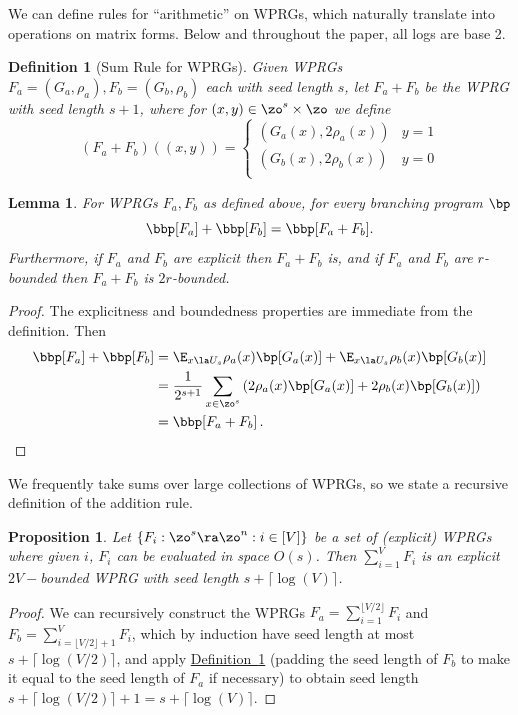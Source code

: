 \documentclass[11pt]{article}
\newcommand{\expref}[2]{\texorpdfstring{\hyperref[#2]{#1~\ref{#2}}}{#1~\ref{#2}}}
\newtheorem{lemma}[theorem]{Lemma}
\newtheorem{proposition}[theorem]{Proposition}
\newtheorem{definition}[theorem]{Definition}
\begin{document}
We can define rules for ``arithmetic'' on WPRGs, which naturally translate into operations on matrix forms. Below and throughout the paper, all logs are base 2.

\begin{definition}[Sum Rule for WPRGs]\label{def:addRule}
Given WPRGs $F_a=(G_a,\rho_a),F_b=(G_b,\rho_b)$ each with seed length $s$, let $F_a+F_b$ be the WPRG with seed length $s+1$, where for $(x,y)\in \zo^s\times\zo$ we define
\[
(F_a+F_b)((x,y)) = \begin{cases}
(G_a(x),2\rho_a(x)) & y=1\\
(G_b(x),2\rho_b(x)) & y=0\\
\end{cases}\]
\end{definition}
\begin{lemma}
For WPRGs $F_a,F_b$ as defined above, for every branching program $\bp$
$$\bbp[F_a]+\bbp[F_b]=\bbp[F_a+F_b].$$
Furthermore, if $F_a$ and $F_b$ are explicit then $F_a+F_b$ is, and if $F_a$ and $F_b$ are $r$-bounded then $F_a+F_b$ is $2r$-bounded.
\end{lemma}
\begin{proof}
The explicitness and boundedness properties are immediate from the definition.
Then %
\begin{align*}
    \bbp[F_a]+\bbp[F_b] &= \E_{x\la U_s}\rho_a(x)\bp[G_a(x)]+\E_{x\la U_s}\rho_b(x)\bp[G_b(x)]\\
    &= \frac{1}{2^{s+1}}\sum_{x\in \zo^s}\left(2\rho_a(x)\bp[G_a(x)]+2\rho_b(x)\bp[G_b(x)]\right)\\
    &= \bbp[F_a+F_b]\,.  \qedhere
\end{align*}
\end{proof}
We frequently take sums over large collections of WPRGs, so we state a recursive definition of the addition rule.
\begin{proposition}\label{prop:multiAdd}
Let $\{F_i:\zo^s\ra\zo^n:i\in [V]\}$ be a set of (explicit) WPRGs where given $i$, $F_i$ can be evaluated in space $O(s)$. Then
$\sum_{i=1}^VF_i$
is an explicit $2V-$bounded WPRG with seed length $s+\lceil\log(V)\rceil$.
\end{proposition}
\begin{proof}
We can recursively construct the WPRGs $F_a=\sum_{i=1}^{\lfloor V/2\rfloor}F_i$ and $F_b=\sum_{i=\lfloor V/2\rfloor+1}^{V}F_i$, which by induction have seed length at most $s+\lceil \log(V/2)\rceil$, and apply \expref{Definition}{def:addRule} (padding the seed length of $F_b$ to make it equal to the seed length of $F_a$ if necessary) to obtain seed length $s+\lceil \log(V/2)\rceil +1=s+\lceil \log(V)\rceil$.
\end{proof}
\end{document}
